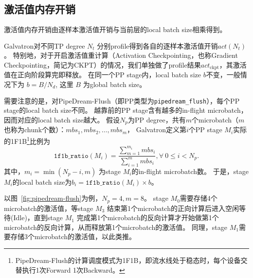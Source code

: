 \documentclass{thuemp}
\begin{document}

\subsection{激活值内存开销}
激活值内存开销由逐样本激活值开销与当前层的local batch size相乘得到。


Galvatron对不同TP degree $N_t$ 分别profile得到各自的逐样本激活值开销$act(N_t)$。
特别地，对于开启激活值重计算（Activation Checkpointing，也称Gradient Checkpointing，简记为CKPT）的情况，我们单独做了profile结果$act_{\text{ckpt}}$，其激活值在正向阶段算完即释放。
在同一个PP stage内，local batch size $b$不变，一般情况下为 $b=B/N_d$, 这里 $B$ 为global batch size。

需要注意的是，对PipeDream-Flush（即PP类型为\texttt{pipedream\_flush}），每个PP stage的local batch size不同。
越靠前的PP stage含有越多的in-flight microbatch，因而对应的local batch size越大。
假设$N_p$为PP degree，共有$m$个microbatch（$m$ 也称为chunk个数）：$mbs_1,mbs_2,\dots,mbs_m$，
Galvatron定义第$i$个PP stage $M_i$实际的1F1B\footnote{PipeDream-Flush的计算调度模式为1F1B，即流水线处于稳态时，每个设备交替执行1次Forward 1次Backward。}比例为
\begin{equation*}
    \texttt{1f1b\_ratio}(M_i) = \frac{\sum_{m=1}^{m_i} mbs_i}{\sum_{i=1}^m mbs_i}, \forall\ 0 \leq i < N_p.
\end{equation*}
其中，$m_i=\min (N_p-i, m)$ 为stage $M_i$的in-flight microbatch数。
于是，stage $M_i$的local batch size为$b_i=\texttt{1f1b\_ratio}(M_i) \times b$。

以图~\ref{fig:pipedream-flush}为例，$N_p=4,m=8$。
stage $M_0$需要存储4个microbatch的激活值，等stage $M_3$ 结束第1个microbatch的正向计算后进入空闲等待(Idle)，直到stage $M_1$ 完成第1个microbatch的反向计算才开始做第1个microbatch的反向计算，从而释放第1个microbatch的激活值。
同理，stage $M_1$需要存储3个microbatch的激活值，以此类推。

\end{document}
